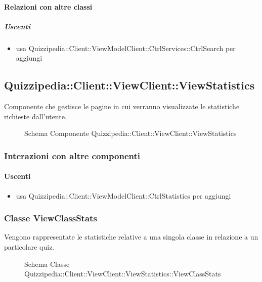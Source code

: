 \paragraph{Relazioni con altre classi}
\subparagraph{Uscenti}
\begin{itemize}
\item usa Quizzipedia::Client::ViewModelClient::CtrlServices::CtrlSearch per aggiungi
\end{itemize}
\subsection{Quizzipedia::Client::ViewClient::ViewStatistics}
Componente che gestisce le pagine in cui verranno visualizzate le statistiche richieste dall'utente.
\begin{figure}[H]
\centering
\noindent{}
\caption[Schema Componente Quizzipedia::Client::ViewClient::ViewStatistics]{Schema Componente Quizzipedia::Client::ViewClient::ViewStatistics}
\end{figure}
\subsubsection{Interazioni con altre componenti}
\paragraph{Uscenti}
\begin{itemize}
\item usa Quizzipedia::Client::ViewModelClient::CtrlStatistics per aggiungi
\end{itemize}
\subsubsection{Classe ViewClassStats}
Vengono rappresentate le statistiche relative a una singola classe in relazione a un particolare quiz.
\begin{figure}[H]
\centering
\noindent{}
\caption[Schema Classe ViewClassStats]{Schema Classe Quizzipedia::Client::ViewClient::ViewStatistics::ViewClassStats}
\end{figure}
